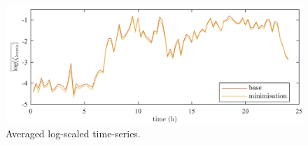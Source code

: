 \begin{figure}\centering
	\includegraphics{_appendices/_a1/fig/averaged-log-cost}
	\caption{Averaged log-scaled time-series.}
	\label{appx-a:ch1:fig:averaged-log-data}
\end{figure}